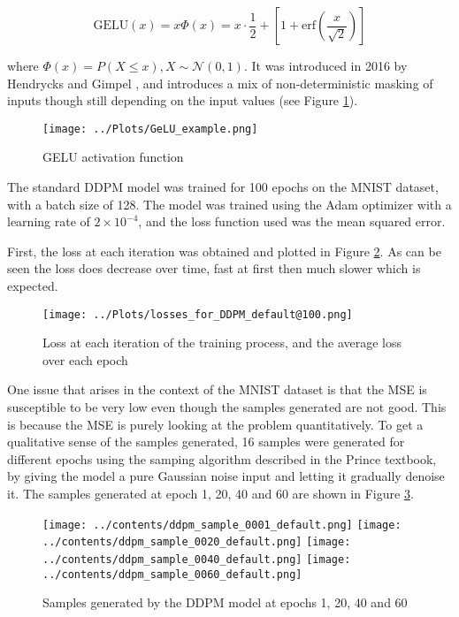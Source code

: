\documentclass[12pt]{report} %
\begin{document}
\begin{equation}
  \text{GELU}(x) = x\Phi(x) = x \cdot \frac{1}{2} + [1 + \text{erf} ( \frac{x}{\sqrt{2}} )]
\end{equation}

where $\Phi(x) = P(X \leq x), X \sim \mathcal{N}(0, 1)$. It was introduced in 2016 by Hendrycks and Gimpel \cite{hendrycks2016gelu}, and introduces a mix of non-deterministic masking of inputs though still depending on the input values (see Figure \ref{fig:gelu}).

\begin{figure}[h]
  \centering
  \texttt{[image: ../Plots/GeLU\_example.png]}
  \caption{GELU activation function}
  \label{fig:gelu}
\end{figure}

The standard DDPM model was trained for 100 epochs on the MNIST dataset, with a batch size of 128. The model was trained using the Adam optimizer with a learning rate of $2 \times 10^{-4}$, and the loss function used was the mean squared error.

First, the loss at each iteration was obtained and plotted in Figure \ref{fig:loss}. As can be seen the loss does decrease over time, fast at first then much slower which is expected.

\begin{figure}[h]
  \centering
  \texttt{[image: ../Plots/losses\_for\_DDPM\_default@100.png]}
  \caption{Loss at each iteration of the training process, and the average loss over each epoch}
  \label{fig:loss}
\end{figure}

\newpage
One issue that arises in the context of the MNIST dataset is that the MSE is susceptible to be very low even though the samples generated are not good. This is because the MSE is purely looking at the problem quantitatively. To get a qualitative sense of the samples generated, 16 samples were generated for different epochs using the samping algorithm described in the Prince textbook\cite[p. 363]{prince2023understanding}, by giving the model a pure Gaussian noise input and letting it gradually denoise it. The samples generated at epoch 1, 20, 40 and 60 are shown in Figure \ref{fig:ddpm_samples}.

\begin{figure}[h]
  \centering
  \texttt{[image: ../contents/ddpm\_sample\_0001\_default.png]}
  \texttt{[image: ../contents/ddpm\_sample\_0020\_default.png]}
  \texttt{[image: ../contents/ddpm\_sample\_0040\_default.png]}
  \texttt{[image: ../contents/ddpm\_sample\_0060\_default.png]}
  \caption{Samples generated by the DDPM model at epochs 1, 20, 40 and 60}
  \label{fig:ddpm_samples}
\end{figure}
\end{document}
